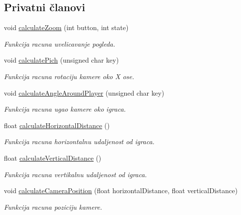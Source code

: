 \subsection*{Privatni članovi}
\begin{DoxyCompactItemize}
\item 
void \hyperlink{classentity_1_1Camera_a7d7bed8b571309039bcfc6cbe2c829de}{calculate\+Zoom} (int button, int state)
\begin{DoxyCompactList}\small\item\em Funkcija racuna uvelicavanje pogleda. \end{DoxyCompactList}\item 
void \hyperlink{classentity_1_1Camera_a65a338e64af13f3da99b46fbf5cf879a}{calculate\+Pich} (unsigned char key)
\begin{DoxyCompactList}\small\item\em Funkcija racuna rotaciju kamere oko X ose. \end{DoxyCompactList}\item 
void \hyperlink{classentity_1_1Camera_a519f8f9f625c56a94d8860c55a134ef3}{calculate\+Angle\+Around\+Player} (unsigned char key)
\begin{DoxyCompactList}\small\item\em Funkcija racuna ugao kamere oko igraca. \end{DoxyCompactList}\item 
float \hyperlink{classentity_1_1Camera_ad5ed7dcbe9aa939d82509c23a6298251}{calculate\+Horizontal\+Distance} ()
\begin{DoxyCompactList}\small\item\em Funkcija racuna horizontalnu udaljenost od igraca. \end{DoxyCompactList}\item 
float \hyperlink{classentity_1_1Camera_a0662170fb43e41f529f4e2932a591858}{calculate\+Vertical\+Distance} ()
\begin{DoxyCompactList}\small\item\em Funkcija racuna vertikalnu udaljenost od igraca. \end{DoxyCompactList}\item 
void \hyperlink{classentity_1_1Camera_a89f1d576fd701ea58b9509b243913952}{calculate\+Camera\+Position} (float horizontal\+Distance, float vertical\+Distance)
\begin{DoxyCompactList}\small\item\em Funkcija racuna poziciju kamere. \end{DoxyCompactList}\end{DoxyCompactItemize}
